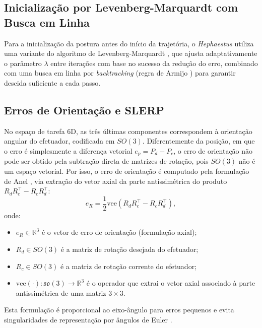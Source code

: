 \subsection{Inicialização por Levenberg-Marquardt com Busca em Linha}

Para a inicialização da postura antes do início da trajetória, o \textit{Hephaestus} utiliza uma variante do algoritmo de Levenberg-Marquardt \cite{marquardt1963algorithm, more2006levenberg}, que ajusta adaptativamente o parâmetro $\lambda$ entre iterações com base no sucesso da redução do erro, combinado com uma busca em linha por \textit{backtracking} (regra de Armijo \cite{armijo1966minimization}) para garantir descida suficiente a cada passo.

\subsection{Erros de Orientação e SLERP}

No espaço de tarefa 6D, as três últimas componentes correspondem à orientação angular do efetuador, codificada em $SO(3)$. Diferentemente da posição, em que o erro é simplesmente a diferença vetorial $e_p = P_d - P_c$, o erro de orientação não pode ser obtido pela subtração direta de matrizes de rotação, pois $SO(3)$ não é um espaço vetorial. Por isso, o erro de orientação é computado pela formulação de Anel \cite{chiaverini1997singularity}, via extração do vetor axial da parte antissimétrica do produto $R_d R_c^\top - R_c R_d^\top$:
\begin{equation}
    e_R = \frac{1}{2}\text{vee}\!\left(R_d R_c^\top - R_c R_d^\top\right),
    \label{eq:orient_error}
\end{equation}
onde:
\begin{itemize}
    \item $e_R \in \mathbb{R}^{3}$ é o vetor de erro de orientação (formulação axial);
    \item $R_d \in SO(3)$ é a matriz de rotação desejada do efetuador;
    \item $R_c \in SO(3)$ é a matriz de rotação corrente do efetuador;
    \item $\text{vee}(\cdot) : \mathfrak{so}(3) \to \mathbb{R}^{3}$ é o operador que extrai o vetor axial associado à parte antissimétrica de uma matriz $3\times 3$.
\end{itemize}
Esta formulação é proporcional ao eixo-ângulo para erros pequenos e evita singularidades de representação por ângulos de Euler \cite{siciliano2009robotics}.

